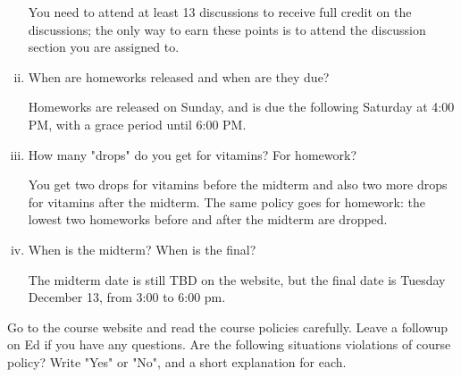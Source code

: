 \documentclass[11pt]{article}
\begin{document}
\begin{Parts}
\begin{enumerate}[(i)]
    \begin{solution}
      You need to attend at least 13 discussions to receive full credit on the discussions; the only way to earn these points is to attend the discussion section you are assigned to.
    \end{solution}
		\item When are homeworks released and when are they due?

		\begin{solution}
      Homeworks are released on Sunday, and is due the following Saturday at 4:00 PM, with a grace period until 6:00 PM. 
    \end{solution}
		\item How many "drops" do you get for vitamins? For homework?\\
		\begin{solution}
      You get two drops for vitamins before the midterm and also two more drops for vitamins after the midterm. The same policy goes for homework: the lowest two homeworks before and after the midterm are dropped.
    \end{solution}
		\item When is the midterm? When is the final?\\
		\begin{solution}
      The midterm date is still TBD on the website, but the final date is Tuesday December 13, from 3:00 to 6:00 pm.  
    \end{solution}
	\end{enumerate}

\end{Parts}


Go to the course website and read the course policies carefully. Leave a followup on Ed if you have any questions. Are the following situations violations of course policy? Write "Yes" or "No", and a short explanation for each.
\end{document}
